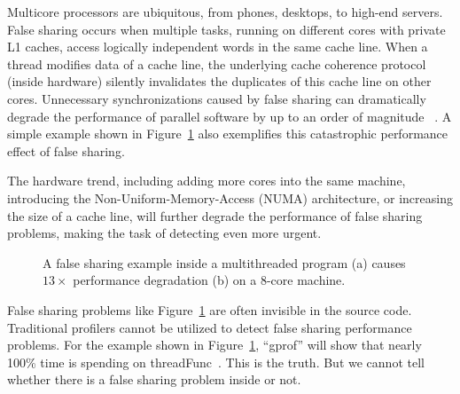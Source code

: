 Multicore processors are ubiquitous, from phones, desktops, to high-end servers.
False sharing occurs when multiple tasks, running on different cores with private L1 caches, access logically independent words in the same cache line. When a thread modifies data of a cache line, the underlying cache coherence protocol (inside hardware) silently invalidates the duplicates of this cache line on other cores. Unnecessary synchronizations caused by false sharing can dramatically degrade the performance of parallel software by up to an order of magnitude ~\cite{falseshare:effect}. A simple example shown in Figure~\ref{fig:penalty} also exemplifies this catastrophic performance effect of false sharing. 

The hardware trend, including adding more cores into the same machine, introducing the Non-Uniform-Memory-Access (NUMA) architecture, or increasing the size of a cache line, will further degrade the performance of false sharing problems, making the task of detecting even more urgent. 

\begin{figure}[htbp]
\centering
{}%
\hspace{30pt}
\caption{
A false sharing example inside a multithreaded program (a) causes $13\times$ performance degradation (b) on a 8-core machine.
\label{fig:penalty}}
\end{figure}

False sharing problems like Figure~\ref{fig:penalty} are often invisible in the source code. Traditional profilers cannot be utilized to detect false sharing performance problems. For the example shown in Figure~\ref{fig:penalty}, ``gprof'' will show that  nearly 100\% time is spending on threadFunc~\cite{gprof}. This is the truth. But we cannot tell whether there is a false sharing problem inside or not.

